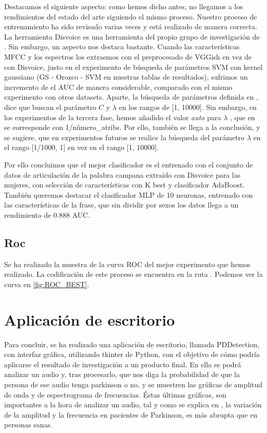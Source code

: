 \begin{tcolorbox}
Destacamos el siguiente aspecto: como hemos dicho antes, no llegamos a los rendimientos del estado del arte siguiendo el mismo proceso. Nuestro proceso de entrenamiento ha sido revisado varias veces y está realizado de manera correcta. La herramienta Disvoice es una herramienta del propio grupo de investigación de \cite{Orz2016}. Sin embargo, un aspecto nos destaca bastante. Cuando las características MFCC y los espectros los extraemos con el preprocesado de VGGish en vez de con Disvoice, justo en el experimento de búsqueda de parámetros SVM con kernel gaussiano (GS - Orozco - SVM en nuestras tablas de resultados), sufrimos un incremento de el AUC de manera considerable, comparado con el mismo experimento con otros datasets. Aparte, la búsqueda de parámetros definida en \cite{Orz2016}, dice que buscan el parámetro $C$ y $\lambda$ en los rangos de [1, 10000]. Sin embargo, en los experimentos de la tercera fase, hemos añadido el valor  \textit{auto} para $\lambda$ , que en  se corresponde con 1/número\_atribs. Por ello, también se llega a la conclusión, y se sugiere, que en experimentos futuros se realice la búsqueda del parámetro $\lambda$ en el rango [1/1000, 1] en vez en el rango [1, 10000].
\end{tcolorbox}

Por ello concluimos que el mejor clasificador es el entrenado con el conjunto de datos de articulación de la palabra campana extraído con Disvoice para las mujeres, con selección de características con K best y clasificador AdaBoost. También queremos destacar el clasificador MLP de 10 neuronas, entrenado con las características  de la frase, que sin dividir por sexos los datos llega a un rendimiento de 0.888 AUC. 

\subsection{Roc}
Se ha realizado la muestra de la curva ROC del mejor experimento que hemos realizado. La codificación de este proceso se encuentra en la ruta . Podemos ver la curva en \ref{fig:ROC_BEST}.


\section{Aplicación de escritorio}
Para concluir, se ha realizado una aplicación de escritorio, llamada PDDetection, con interfaz gráfica, utilizando tkinter de Python, con el objetivo de cómo podría aplicarse el resultado de investigación a un producto final. En ella se podrá analizar un audio y, tras procesarlo, que nos diga la probabilidad de que la persona de ese audio tenga parkinson o no, y se muestren las gráficas de amplitud de onda y de espectrograma de frecuencias. Éstas últimas gráficas, son importantes a la hora de analizar un audio, tal y como se explica en \cite{godino2017towards}, la variación de la amplitud y la frecuencia en pacientes de Parkinson, es más abrupta que en personas sanas.

